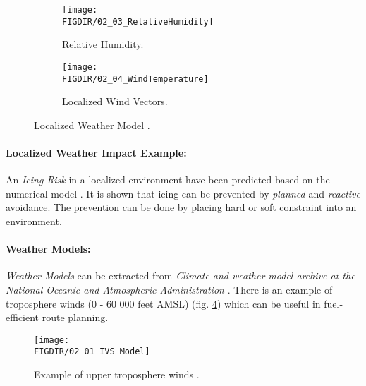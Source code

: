 \begin{figure}[H]
	\centering
	\begin{subfigure}{0.45\textwidth}
		\texttt{[image: \\FIGDIR/02\_03\_RelativeHumidity]}
		\caption{Relative Humidity.} 
		\label{fig:humidityRelativeLocalizedExample}
	\end{subfigure}
	\vspace{1em} 
	\begin{subfigure}{0.45\textwidth} %
		\texttt{[image: \\FIGDIR/02\_04\_WindTemperature]}
		\caption{Localized Wind Vectors.} %
		\label{fig:localizedWindVectorsExample}
	\end{subfigure}
	\caption{Localized Weather Model \cite{balaban2017dynamic}.} %
	\label{fig:localizedWeatherModelExample}
\end{figure}
    
\paragraph{Localized Weather Impact Example:} An \emph{Icing Risk} in a localized environment have been predicted based on the numerical model \cite{thompson2017numerical}. It is shown that icing can be prevented by \emph{planned} and \emph{reactive} avoidance. The prevention can be done by placing hard or soft constraint into an environment. 

    
\paragraph{Weather Models:} \emph{Weather Models} can be extracted from \emph{Climate and weather model archive at the National Oceanic and Atmospheric Administration} \cite{rutledge2006nomads}. There is an example of troposphere winds (0 - 60 000 feet AMSL) (fig. \ref{fig:ExampleOfTroposphereWinds}) which can be useful in fuel-efficient route planning. 
    
\begin{figure}[H]
    \centering
    \texttt{[image: \\FIGDIR/02\_01\_IVS\_Model]}
    \caption{Example of upper troposphere winds \cite{rutledge2006nomads}.}
    \label{fig:ExampleOfTroposphereWinds}
\end{figure}